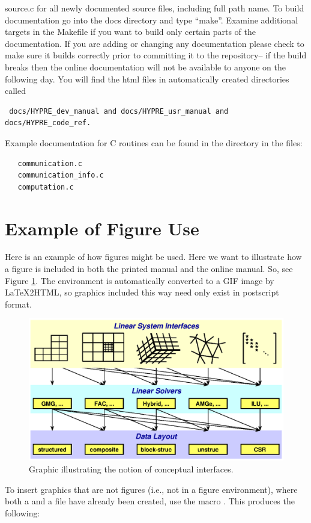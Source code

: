 source.c for all newly documented source files, including full path name. 
\newline\newline
To build documentation go into the docs directory and type ``make''.  
Examine additional targets in the Makefile if you want to build only
certain parts of the documentation.   If you are adding or changing any
documentation please check to make sure it builds correctly prior to 
committing it to the repository-- if the build breaks then the online 
documentation will not be available to anyone on the following day. You will
find the html files in automatically created directories called 
\begin{verbatim} docs/HYPRE_dev_manual and docs/HYPRE_usr_manual and docs/HYPRE_code_ref.\end{verbatim}

Example documentation for C routines can be found in the directory
 in the files:
\begin{verbatim}
   communication.c
   communication_info.c
   computation.c
\end{verbatim}

\section{Example of Figure Use}
\label{Example of Figure Use}

Here is an example of how figures might be used.  Here we want to
illustrate how a figure is included in both the printed manual and the
online manual.  So, see Figure \ref{fig-conceptual-interface}.  The
 environment is automatically converted to a GIF image by
LaTeX2HTML, so graphics included this way need only exist in
postscript format.
\begin{figure}
\centering
\includegraphics[width=5in]{concep_iface.eps}
\caption{%
Graphic illustrating the notion of conceptual interfaces.}
\label{fig-conceptual-interface}
\end{figure}

To insert graphics that are not figures (i.e., not in a figure
environment), where both a  and a  file have
already been created, use the macro .  This
produces the following:

\begin{center}
\end{center}
